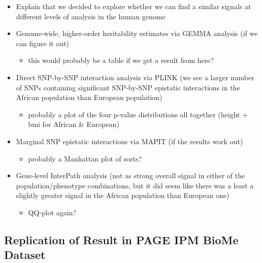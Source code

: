 \documentclass[12pt, a4paper]{article}
\begin{document}
\begin{itemize}
    \item Explain that we decided to explore whether we can find a similar signals at different levels of analysis in the human genome
    \item Genome-wide, higher-order heritability estimates via GEMMA analysis (if we can figure it out)
    \begin{itemize}
        \item this would probably be a table if we get a result from here?
    \end{itemize}
    \item Direct SNP-by-SNP interaction analysis via PLINK (we see a larger number of SNPs containing significant SNP-by-SNP epistatic interactions in the African population than European population)
    \begin{itemize}
        \item probably a plot of the four p-value distributions all together (height + bmi for African \& European)
    \end{itemize}
    \item Marginal SNP epistatic interactions via MAPIT (if the results work out)
    \begin{itemize}
        \item probably a Manhattan plot of sorts?
    \end{itemize}
    \item Gene-level InterPath analysis (not as strong overall signal in either of the population/phenotype combinations, but it did seem like there was a least a slightly greater signal in the African population than European one)
    \begin{itemize}
        \item QQ-plot again?
    \end{itemize}
\end{itemize}

\subsection{Replication of Result in PAGE IPM BioMe Dataset}\label{InterPath-Results-IPMBioMeReplication}
\end{document}
